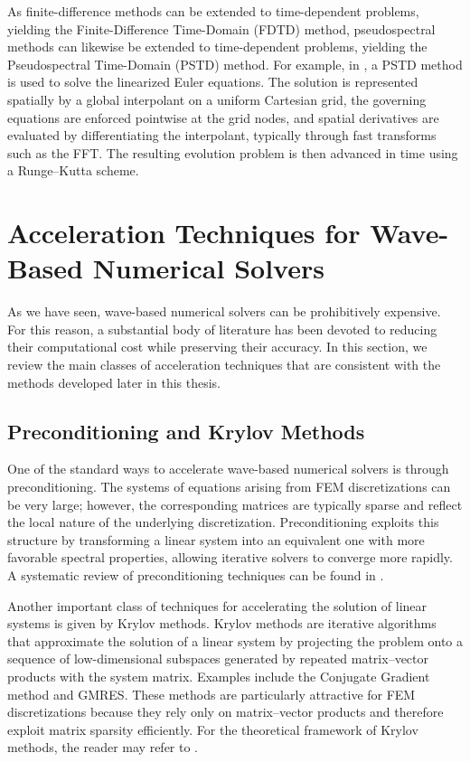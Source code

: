 \documentclass{Configuration_Files/PoliMi3i_thesis}
\begin{document}
As finite-difference methods can be extended to time-dependent problems, yielding the Finite-Difference Time-Domain (FDTD) method, pseudospectral methods can likewise be extended to time-dependent problems, yielding the Pseudospectral Time-Domain (PSTD) method. For example, in \cite{hornikx_extended_2010}, a PSTD method is used to solve the linearized Euler equations. The solution is represented spatially by a global interpolant on a uniform Cartesian grid, the governing equations are enforced pointwise at the grid nodes, and spatial derivatives are evaluated by differentiating the interpolant, typically through fast transforms such as the FFT. The resulting evolution problem is then advanced in time using a Runge--Kutta scheme.
%
\section{Acceleration Techniques for Wave-Based Numerical Solvers}
As we have seen, wave-based numerical solvers can be prohibitively expensive. For this reason, a substantial body of literature has been devoted to reducing their computational cost while preserving their accuracy. In this section, we review the main classes of acceleration techniques that are consistent with the methods developed later in this thesis.
%
\subsection{Preconditioning and Krylov Methods}
One of the standard ways to accelerate wave-based numerical solvers is through preconditioning. The systems of equations arising from FEM discretizations can be very large; however, the corresponding matrices are typically sparse and reflect the local nature of the underlying discretization. Preconditioning exploits this structure by transforming a linear system into an equivalent one with more favorable spectral properties, allowing iterative solvers to converge more rapidly. A systematic review of preconditioning techniques can be found in \cite{chen_matrix_2005}.

Another important class of techniques for accelerating the solution of linear systems is given by Krylov methods. Krylov methods are iterative algorithms that approximate the solution of a linear system by projecting the problem onto a sequence of low-dimensional subspaces generated by repeated matrix--vector products with the system matrix. Examples include the Conjugate Gradient method and GMRES. These methods are particularly attractive for FEM discretizations because they rely only on matrix--vector products and therefore exploit matrix sparsity efficiently. For the theoretical framework of Krylov methods, the reader may refer to \cite{liesen_krylov_2012}.
\end{document}
